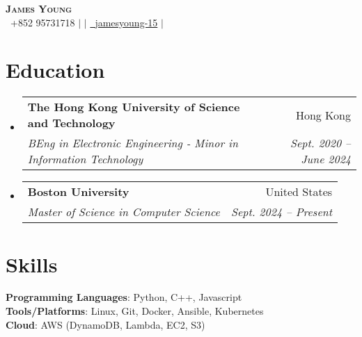 \documentclass[letterpaper,12pt]{article}
\makeatletter
\newcommand{\resumeSubheading}[4]{
  \vspace{-2pt}\item
    \begin{tabular*}{0.97\textwidth}[t]{l@{\extracolsep{\fill}}r}
      \textbf{#1} & #2 \\
      \textit{\small#3} & \textit{\small #4} \\
    \end{tabular*}\vspace{-7pt}
}
\newcommand{\resumeSubHeadingListStart}{\begin{itemize}[leftmargin=0.05in, label={}]}
\newcommand{\resumeSubHeadingListEnd}{\end{itemize}}
\makeatother
\begin{document}
\begin{center}
    \textbf{\Huge \scshape James Young} \\ \vspace{2pt}
    \small  \faPhone\ {+852 95731718} $|$ 
    \href{mailto:jyyoungaa@connect.ust.hk}{} $|$ 
    \href{https://github.com/jamesyoung-15} {\faGithub\ {jamesyoung-15}} $|$
    \href{https://linkedin.com/in/jamesyyoung}{}
\end{center}


\section{Education}
  \resumeSubHeadingListStart
    \resumeSubheading
      {The Hong Kong University of Science and Technology}{Hong Kong}
      {BEng in Electronic Engineering - Minor in Information Technology}{Sept. 2020 -- June 2024}
  \resumeSubHeadingListEnd
  \resumeSubHeadingListStart
    \resumeSubheading
      {Boston University}{United States}
      {Master of Science in Computer Science}{Sept. 2024 -- Present}
  \resumeSubHeadingListEnd


\section{Skills}
 \begin{itemize}[leftmargin=0.15in, label={}]
    \small{\item{
     \textbf{Programming Languages}{: Python, C++, Javascript} \\
     \textbf{Tools/Platforms}{: Linux, Git, Docker, Ansible, Kubernetes} \\ 
     \textbf{Cloud}{: AWS (DynamoDB, Lambda, EC2, S3)} \\
    }}
 \end{itemize}
\end{document}
